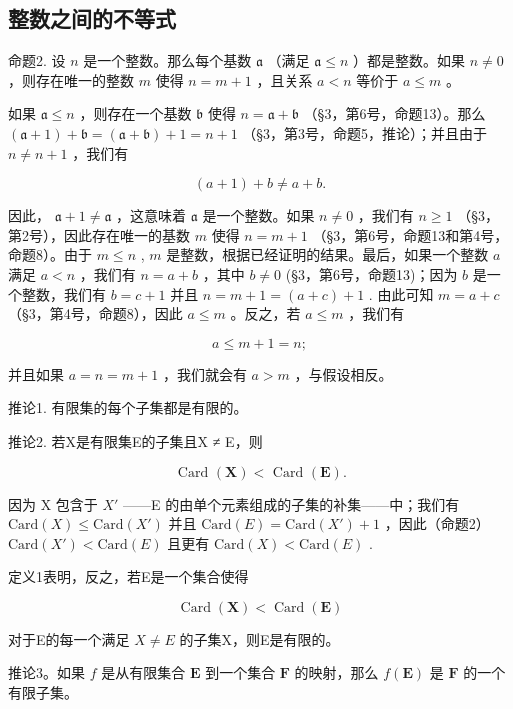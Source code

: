 \subsection{整数之间的不等式}

命题2. 设 \(n\) 是一个整数。那么每个基数 \(\mathfrak{a}\) （满足 \(\mathfrak{a} \leqslant n\) ）都是整数。如果 \(n \neq 0\) ，则存在唯一的整数 \(m\) 使得 \(n = m + 1\) ，且关系 \(a < n\) 等价于 \(a \leqslant m\) 。

如果 \(\mathfrak{a} \leqslant n\) ，则存在一个基数 \(\mathfrak{b}\) 使得 \(n = \mathfrak{a} + \mathfrak{b}\) （§3，第6号，命题13）。那么 \((\mathfrak{a} + 1) + \mathfrak{b} = (\mathfrak{a} + \mathfrak{b}) + 1 = n + 1\) （§3，第3号，命题5，推论）；并且由于 \(n \neq n + 1\) ，我们有

\[
(a + 1) + b \neq a + b.
\]

因此， \(\mathfrak{a} + 1 \neq \mathfrak{a}\) ，这意味着 \(\mathfrak{a}\) 是一个整数。如果 \(n \neq 0\) ，我们有 \(n \geqslant 1\) （§3，第2号），因此存在唯一的基数 \(m\) 使得 \(n = m + 1\) （§3，第6号，命题13和第4号，命题8）。由于 \(m \leqslant n\) , \(m\) 是整数，根据已经证明的结果。最后，如果一个整数 \(a\) 满足 \(a < n\) ，我们有 \(n = a + b\) ，其中 \(b \neq 0\) (§3，第6号，命题13)；因为 \(b\) 是一个整数，我们有 \(b = c + 1\) 并且 \(n = m + 1 = (a + c) + 1\) . 由此可知 \(m = a + c\) （§3，第4号，命题8），因此 \(a \leqslant m\) 。反之，若 \(a \leqslant m\) ，我们有

\[
a \leqslant m + 1 = n;
\]

并且如果 \(a = n = m + 1\) ，我们就会有 \(a > m\) ，与假设相反。

推论1. 有限集的每个子集都是有限的。

推论2. 若X是有限集E的子集且X ≠ E，则

\[
\text { Card } (\mathbf {X}) <   \text { Card } (\mathbf {E}).
\]

因为 X 包含于 \(X'\) ——E 的由单个元素组成的子集的补集——中；我们有 \(\text{Card}(X) \leqslant \text{Card}(X')\) 并且 \(\text{Card}(E) = \text{Card}(X') + 1\) ，因此（命题2） \(\text{Card}(X') < \text{Card}(E)\) 且更有 \(\text{Card}(X) < \text{Card}(E)\) .

定义1表明，反之，若E是一个集合使得

\[
\operatorname{Card} (\mathbf {X}) <   \operatorname{Card} (\mathbf {E})
\]

对于E的每一个满足 \(X \neq E\) 的子集X，则E是有限的。

推论3。如果 \(f\) 是从有限集合 \(\mathbf{E}\) 到一个集合 \(\mathbf{F}\) 的映射，那么 \(f(\mathbf{E})\) 是 \(\mathbf{F}\) 的一个有限子集。

